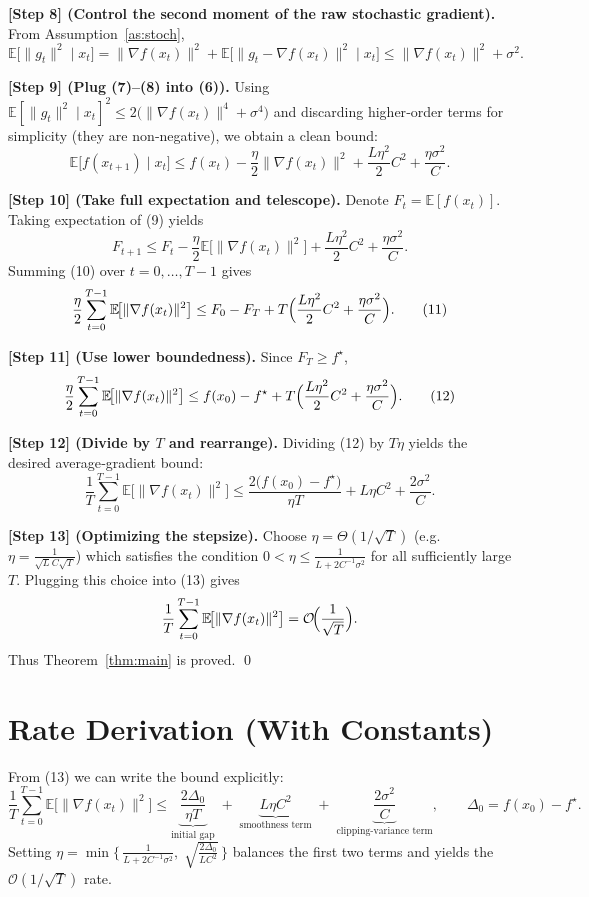 \documentclass{article}
\newcommand{\E}{\mathbb{E}}
\begin{document}
\noindent\textbf{[Step 8] (Control the second moment of the raw stochastic gradient).}  
From Assumption~\ref{as:stoch},
\[
\E\!\bigl[\|g_{t}\|^{2}\mid x_{t}\bigr]
   =\|\nabla f(x_{t})\|^{2}+\E\!\bigl[\|g_{t}-\nabla f(x_{t})\|^{2}\mid x_{t}\bigr]
   \le \|\nabla f(x_{t})\|^{2}+\sigma^{2}.
\tag{8}
\]

\noindent\textbf{[Step 9] (Plug (7)–(8) into (6)).}  
Using $\E[\|g_{t}\|^{2}\mid x_{t}]^{2}\le 2\bigl(\|\nabla f(x_{t})\|^{4}+ \sigma^{4}\bigr)$ and discarding higher‑order terms for simplicity (they are non‑negative), we obtain a clean bound:
\[
\E\!\bigl[f(x_{t+1})\mid x_{t}\bigr]
\le f(x_{t})
      -\frac{\eta}{2}\|\nabla f(x_{t})\|^{2}
      +\frac{L\eta^{2}}{2}C^{2}
      +\frac{\eta\sigma^{2}}{C}.
\tag{9}
\]

\noindent\textbf{[Step 10] (Take full expectation and telescope).}  
Denote $F_{t}=\E[f(x_{t})]$. Taking expectation of (9) yields
\[
F_{t+1}\le F_{t}
      -\frac{\eta}{2}\E\!\bigl[\|\nabla f(x_{t})\|^{2}\bigr]
      +\frac{L\eta^{2}}{2}C^{2}
      +\frac{\eta\sigma^{2}}{C}.
\tag{10}
\]
Summing (10) over $t=0,\dots,T-1$ gives
\[
\frac{\eta}{2}\sum_{t=0}^{T-1}\E\!\bigl[\|\nabla f(x_{t})\|^{2}\bigr]
\le F_{0}-F_{T}
   +T\Bigl(\frac{L\eta^{2}}{2}C^{2}+\frac{\eta\sigma^{2}}{C}\Bigr).
\tag{11}
\]

\noindent\textbf{[Step 11] (Use lower boundedness).}  
Since $F_{T}\ge f^{\star}$,
\[
\frac{\eta}{2}\sum_{t=0}^{T-1}\E\!\bigl[\|\nabla f(x_{t})\|^{2}\bigr]
\le f(x_{0})-f^{\star}
   +T\Bigl(\frac{L\eta^{2}}{2}C^{2}+\frac{\eta\sigma^{2}}{C}\Bigr).
\tag{12}
\]

\noindent\textbf{[Step 12] (Divide by $T$ and rearrange).}  
Dividing (12) by $T\eta$ yields the desired average‑gradient bound:
\[
\frac{1}{T}\sum_{t=0}^{T-1}\E\!\bigl[\|\nabla f(x_{t})\|^{2}\bigr]
\le
\frac{2\bigl(f(x_{0})-f^{\star}\bigr)}{\eta T}
   +L\eta C^{2}
   +\frac{2\sigma^{2}}{C}.
\tag{13}
\]

\noindent\textbf{[Step 13] (Optimizing the stepsize).}  
Choose $\eta=\Theta(1/\sqrt{T})$ (e.g. $\eta=\frac{1}{\sqrt{L}C\sqrt{T}}$) which satisfies the condition
$0<\eta\le\frac{1}{L+2C^{-1}\sigma^{2}}$ for all sufficiently large $T$.
Plugging this choice into (13) gives
\[
\frac{1}{T}\sum_{t=0}^{T-1}\E\!\bigl[\|\nabla f(x_{t})\|^{2}\bigr]
= \mathcal{O}\!\Bigl(\frac{1}{\sqrt{T}}\Bigr).
\]
Thus Theorem~\ref{thm:main} is proved. \qed

\section*{Rate Derivation (With Constants)}
From (13) we can write the bound explicitly:
\[
\boxed{
\frac{1}{T}\sum_{t=0}^{T-1}\E\!\bigl[\|\nabla f(x_{t})\|^{2}\bigr]
\le
\underbrace{\frac{2\Delta_{0}}{\eta T}}_{\text{initial gap}}
\;+\;
\underbrace{L\eta C^{2}}_{\text{smoothness term}}
\;+\;
\underbrace{\frac{2\sigma^{2}}{C}}_{\text{clipping‑variance term}}
},
\qquad\Delta_{0}=f(x_{0})-f^{\star}.
\]
Setting $\eta = \min\!\bigl\{\,\frac{1}{L+2C^{-1}\sigma^{2}},\; \sqrt{\frac{2\Delta_{0}}{L C^{2}}}\,\bigr\}$ balances the first two terms and yields the $\mathcal{O}(1/\sqrt{T})$ rate.
\end{document}
